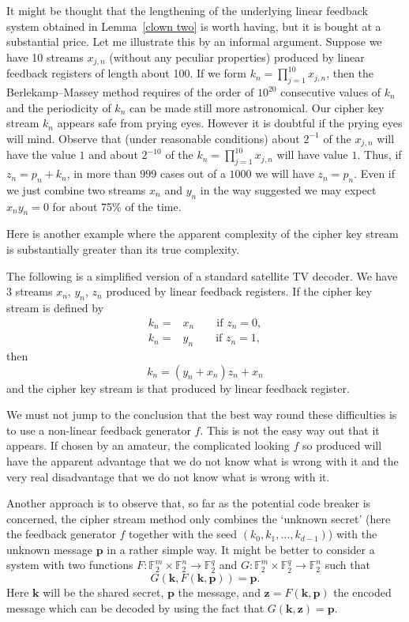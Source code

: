 It might be thought that the lengthening
of the underlying linear feedback system
obtained in Lemma~\ref{clown two} is worth
having, but it is bought at a substantial
price. Let me illustrate this by an informal
argument. Suppose we have 10
streams  $x_{j,n}$ (without any peculiar
properties) produced by
linear feedback registers of length about
100. If we form
$k_{n}=\prod_{j=1}^{10}x_{j,n}$, then
the Berlekamp--Massey method requires
of the order of $10^{20}$ consecutive
values of $k_{n}$ and the periodicity
of $k_{n}$ can be made still more
astronomical. Our cipher key stream
$k_{n}$ appears safe from prying eyes.
However it is doubtful if the prying
eyes will mind. Observe that (under reasonable
conditions) about $2^{-1}$ of the $x_{j,n}$
will have the value $1$ and about
$2^{-10}$ of the $k_{n}=\prod_{j=1}^{10}x_{j,n}$
will have value $1$. Thus, if
$z_{n}=p_{n}+k_{n}$, in more than
$999$ cases out of a $1000$ we will have
$z_{n}=p_{n}$. Even if we just combine
two streams $x_{n}$ and $y_{n}$ in the
way suggested we may expect $x_{n}y_{n}=0$
for about 75\% of the time.


Here is another example where the apparent
complexity of the cipher key stream
is substantially greater than its true
complexity.
\begin{example} The following is a simplified
version of a standard satellite TV decoder.
We have 3 streams  $x_{n}$, $y_{n}$, $z_{n}$
produced by linear feedback registers.
If the cipher key stream is defined by
\begin{align*}
k_{n}=&x_{n}\qquad\text{if $z_{n}=0$},\\
k_{n}=&y_{n}\qquad\text{if $z_{n}=1$},
\end{align*}
then
\[k_{n}=(y_{n}+x_{n})z_{n}+x_{n}\]
and the cipher key stream is that produced
by linear feedback register.
\end{example}

We must not jump to the conclusion 
that the best way round
these difficulties is to use a non-linear
feedback generator $f$. This is not the
easy way out that it appears. If chosen
by an amateur, the  complicated looking
$f$ so produced will have the apparent
advantage that we do not know what is
wrong with it and the very real disadvantage
that we do not know what is
wrong with it.



Another approach is to observe that,
so far as the potential code breaker is
concerned, the
cipher stream method only combines the
`unknown secret' (here the feedback generator
$f$ together with the seed $(k_{0},k_{1},\dots,k_{d-1})$)
with the unknown message ${\mathbf p}$ in a rather
simple way. It might be better to consider a system
with two functions
$F:{\mathbb F}_{2}^{m}\times{\mathbb F}_{2}^{n}
\rightarrow{\mathbb F}_{2}^{q}$ and
$G:{\mathbb F}_{2}^{m}\times{\mathbb F}_{2}^{q}
\rightarrow{\mathbb F}_{2}^{n}$
such that
\[G({\mathbf k},F({\mathbf k},{\mathbf p}))={\mathbf p}.\]
Here ${\mathbf k}$ will be
the shared secret, ${\mathbf p}$ the message, and
${\mathbf z}=F({\mathbf k},{\mathbf p})$ the
encoded message which can be decoded by
using the fact that $G({\mathbf k},{\mathbf z})
={\mathbf p}$.


